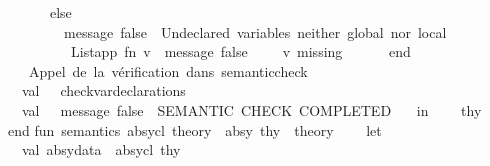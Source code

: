 \begin{isabellebody}
\ \ \ \ \ \ \ \ else\isanewline
\ \ \ \ \ \ \ \ \ \ {\isacharparenleft}{\kern0pt}message\ false\ {\isachardoublequote}{\kern0pt}{\isasymcrossmark}\ Undeclared\ variables\ {\isacharparenleft}{\kern0pt}neither\ global\ nor\ local{\isacharparenright}{\kern0pt}{\isacharcolon}{\kern0pt}{\isachardoublequote}{\kern0pt}{\isacharsemicolon}{\kern0pt}\isanewline
\ \ \ \ \ \ \ \ \ \ \ List{\isachardot}{\kern0pt}app\ {\isacharparenleft}{\kern0pt}fn\ v\ {\isacharequal}{\kern0pt}{\isachargreater}{\kern0pt}\ message\ false\ {\isacharparenleft}{\kern0pt}{\isachardoublequote}{\kern0pt}\ \ {\isachardoublequote}{\kern0pt}\ {\isacharcircum}{\kern0pt}\ v{\isacharparenright}{\kern0pt}{\isacharparenright}{\kern0pt}\ missing{\isacharparenright}{\kern0pt}\isanewline
\ \ \ \ \ \ end\isanewline
\ \ \ \ \isanewline
\ \ \ \ {\isacharparenleft}{\kern0pt}{\isacharasterisk}{\kern0pt}\ Appel\ de\ la\ vérification\ dans\ semantic{\isacharunderscore}{\kern0pt}check\ {\isacharminus}{\kern0pt}{\isacharminus}{\kern0pt}{\isacharminus}{\kern0pt}{\isacharminus}{\kern0pt}{\isacharminus}{\kern0pt}{\isacharminus}{\kern0pt}{\isacharminus}{\kern0pt}{\isacharminus}{\kern0pt}{\isacharminus}{\kern0pt}{\isacharminus}{\kern0pt}{\isacharminus}{\kern0pt}{\isacharminus}{\kern0pt}{\isacharminus}{\kern0pt}{\isacharminus}{\kern0pt}{\isacharminus}{\kern0pt}{\isacharminus}{\kern0pt}{\isacharminus}{\kern0pt}{\isacharminus}{\kern0pt}{\isacharminus}{\kern0pt}{\isacharminus}{\kern0pt}{\isacharminus}{\kern0pt}{\isacharminus}{\kern0pt}\ {\isacharasterisk}{\kern0pt}{\isacharparenright}{\kern0pt}\isanewline
\ \ \ \ val\ {\isacharunderscore}{\kern0pt}\ {\isacharequal}{\kern0pt}\ check{\isacharunderscore}{\kern0pt}var{\isacharunderscore}{\kern0pt}declarations\ {\isacharparenleft}{\kern0pt}{\isacharparenright}{\kern0pt}\isanewline
\ \ \ \ \isanewline
\ \ \ \ val\ {\isacharunderscore}{\kern0pt}\ {\isacharequal}{\kern0pt}\ message\ false\ {\isachardoublequote}{\kern0pt}{\isacharequal}{\kern0pt}{\isacharequal}{\kern0pt}{\isacharequal}{\kern0pt}\ SEMANTIC\ CHECK\ COMPLETED\ {\isacharequal}{\kern0pt}{\isacharequal}{\kern0pt}{\isacharequal}{\kern0pt}{\isachardoublequote}{\kern0pt}\isanewline
\ \ in\isanewline
\ \ \ \ thy\isanewline
\ \ end\isanewline
\isanewline
fun\ semantics\ {\isacharparenleft}{\kern0pt}absy{\isacharunderscore}{\kern0pt}cl{\isacharcolon}{\kern0pt}\ theory\ {\isacharminus}{\kern0pt}{\isachargreater}{\kern0pt}\ absy{\isacharparenright}{\kern0pt}\ {\isacharparenleft}{\kern0pt}thy\ {\isacharcolon}{\kern0pt}\ theory{\isacharparenright}{\kern0pt}\ {\isacharequal}{\kern0pt}\ \isanewline
\ \ let\isanewline
\ \ \ \ val\ absy{\isacharunderscore}{\kern0pt}data\ {\isacharequal}{\kern0pt}\ absy{\isacharunderscore}{\kern0pt}cl\ thy\isanewline

\end{isabellebody}
